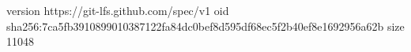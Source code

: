 version https://git-lfs.github.com/spec/v1
oid sha256:7ca5fb3910899010387122fa84dc0bef8d595df68ec5f2b40ef8e1692956a62b
size 11048
